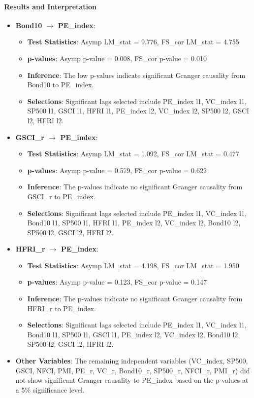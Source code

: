 \documentclass[12pt]{article}
\begin{document}
\paragraph{Results and Interpretation}
\begin{itemize}
    \item \textbf{Bond10 $\rightarrow$ PE\_index}: 
        \begin{itemize}
            \item \textbf{Test Statistics}: Asymp LM\_stat = 9.776, FS\_cor LM\_stat = 4.755
            \item \textbf{p-values}: Asymp p-value = 0.008, FS\_cor p-value = 0.010
            \item \textbf{Inference}: The low p-values indicate significant Granger causality from Bond10 to PE\_index.
            \item \textbf{Selections}: Significant lags selected include PE\_index l1, VC\_index l1, SP500 l1, GSCI l1, HFRI l1, PE\_index l2, VC\_index l2, SP500 l2, GSCI l2, HFRI l2.
        \end{itemize}
    \item \textbf{GSCI\_r $\rightarrow$ PE\_index}: 
        \begin{itemize}
            \item \textbf{Test Statistics}: Asymp LM\_stat = 1.092, FS\_cor LM\_stat = 0.477
            \item \textbf{p-values}: Asymp p-value = 0.579, FS\_cor p-value = 0.622
            \item \textbf{Inference}: The p-values indicate no significant Granger causality from GSCI\_r to PE\_index.
            \item \textbf{Selections}: Significant lags selected include PE\_index l1, VC\_index l1, Bond10 l1, SP500 l1, HFRI l1, PE\_index l2, VC\_index l2, Bond10 l2, SP500 l2, GSCI l2, HFRI l2.
        \end{itemize}
    \item \textbf{HFRI\_r $\rightarrow$ PE\_index}: 
        \begin{itemize}
            \item \textbf{Test Statistics}: Asymp LM\_stat = 4.198, FS\_cor LM\_stat = 1.950
            \item \textbf{p-values}: Asymp p-value = 0.123, FS\_cor p-value = 0.147
            \item \textbf{Inference}: The p-values indicate no significant Granger causality from HFRI\_r to PE\_index.
            \item \textbf{Selections}: Significant lags selected include PE\_index l1, VC\_index l1, Bond10 l1, SP500 l1, GSCI l1, PE\_index l2, VC\_index l2, Bond10 l2, SP500 l2, GSCI l2, HFRI l2.
        \end{itemize}
    \item \textbf{Other Variables}: The remaining independent variables (VC\_index, SP500, GSCI, NFCI, PMI, PE\_r, VC\_r, Bond10\_r, SP500\_r, NFCI\_r, PMI\_r) did not show significant Granger causality to PE\_index based on the p-values at a 5\% significance level.
\end{itemize}
\end{document}
